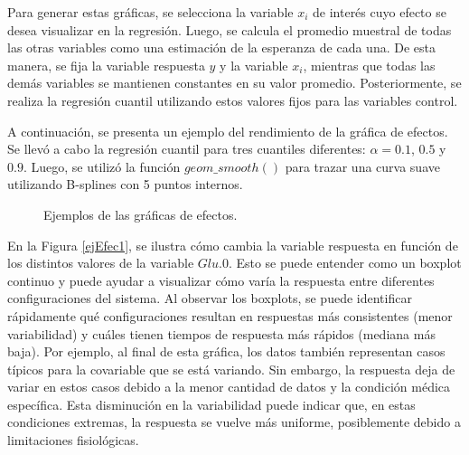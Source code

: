 Para generar estas gráficas, se selecciona la variable $x_i$ de interés cuyo efecto se desea visualizar en la regresión. Luego, se calcula el promedio muestral de todas las otras variables como una estimación de la esperanza de cada una. De esta manera, se fija la variable respuesta $y$ y la variable $x_i$, mientras que todas las demás variables se mantienen constantes en su valor promedio. Posteriormente, se realiza la regresión cuantil utilizando estos valores fijos para las variables control.

A continuación, se presenta un ejemplo del rendimiento de la gráfica de efectos. Se llevó a cabo la regresión cuantil para tres cuantiles diferentes: $\alpha = 0.1$, $0.5$ y $0.9$. Luego, se utilizó la función $geom\_smooth()$ para trazar una curva suave utilizando B-splines con 5 puntos internos. 

\begin{figure}[H]
 \centering
    \caption{Ejemplos de las gráficas de efectos.}
    \label{fig:Efectos}
\end{figure}

En la Figura \ref{ejEfec1}, se ilustra cómo cambia la variable respuesta en función de los distintos valores de la variable $Glu.0$. Esto se puede entender como un boxplot continuo y puede ayudar a visualizar cómo varía la respuesta entre diferentes configuraciones del sistema. Al observar los boxplots, se puede identificar rápidamente qué configuraciones resultan en respuestas más consistentes (menor variabilidad) y cuáles tienen tiempos de respuesta más rápidos (mediana más baja). Por ejemplo, al final de esta gráfica, los datos también representan casos típicos para la covariable que se está variando. Sin embargo, la respuesta deja de variar en estos casos debido a la menor cantidad de datos y la condición médica específica. Esta disminución en la variabilidad puede indicar que, en estas condiciones extremas, la respuesta se vuelve más uniforme, posiblemente debido a limitaciones fisiológicas.


